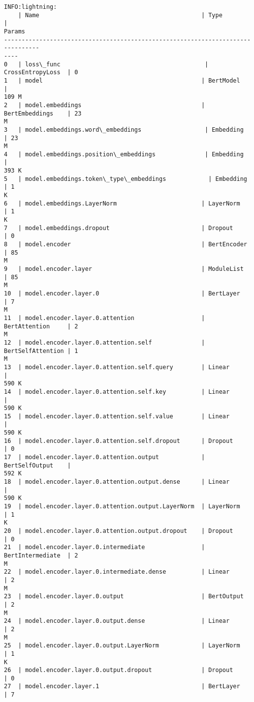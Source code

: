 \documentclass[10pt]{article}
\begin{document}
    \begin{Verbatim}[commandchars=\\\{\}]
INFO:lightning:
    | Name                                              | Type              |
Params
--------------------------------------------------------------------------------
----
0   | loss\_func                                         | CrossEntropyLoss  | 0
1   | model                                             | BertModel         |
109 M
2   | model.embeddings                                  | BertEmbeddings    | 23
M
3   | model.embeddings.word\_embeddings                  | Embedding         | 23
M
4   | model.embeddings.position\_embeddings              | Embedding         |
393 K
5   | model.embeddings.token\_type\_embeddings            | Embedding         | 1
K
6   | model.embeddings.LayerNorm                        | LayerNorm         | 1
K
7   | model.embeddings.dropout                          | Dropout           | 0
8   | model.encoder                                     | BertEncoder       | 85
M
9   | model.encoder.layer                               | ModuleList        | 85
M
10  | model.encoder.layer.0                             | BertLayer         | 7
M
11  | model.encoder.layer.0.attention                   | BertAttention     | 2
M
12  | model.encoder.layer.0.attention.self              | BertSelfAttention | 1
M
13  | model.encoder.layer.0.attention.self.query        | Linear            |
590 K
14  | model.encoder.layer.0.attention.self.key          | Linear            |
590 K
15  | model.encoder.layer.0.attention.self.value        | Linear            |
590 K
16  | model.encoder.layer.0.attention.self.dropout      | Dropout           | 0
17  | model.encoder.layer.0.attention.output            | BertSelfOutput    |
592 K
18  | model.encoder.layer.0.attention.output.dense      | Linear            |
590 K
19  | model.encoder.layer.0.attention.output.LayerNorm  | LayerNorm         | 1
K
20  | model.encoder.layer.0.attention.output.dropout    | Dropout           | 0
21  | model.encoder.layer.0.intermediate                | BertIntermediate  | 2
M
22  | model.encoder.layer.0.intermediate.dense          | Linear            | 2
M
23  | model.encoder.layer.0.output                      | BertOutput        | 2
M
24  | model.encoder.layer.0.output.dense                | Linear            | 2
M
25  | model.encoder.layer.0.output.LayerNorm            | LayerNorm         | 1
K
26  | model.encoder.layer.0.output.dropout              | Dropout           | 0
27  | model.encoder.layer.1                             | BertLayer         | 7

\end{Verbatim}
\end{document}
